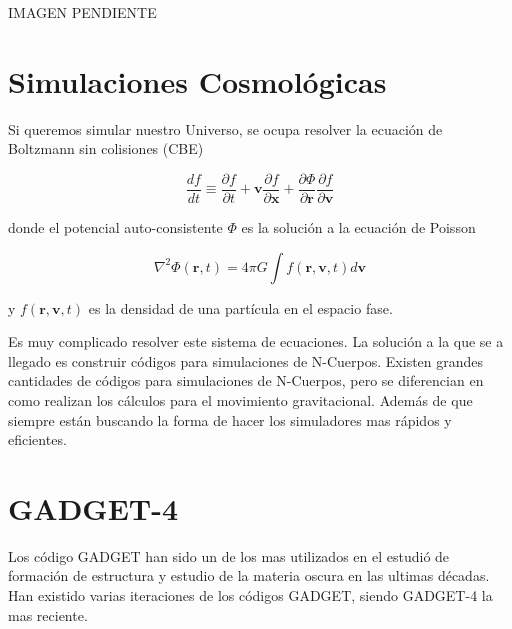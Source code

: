 {\LARGE
IMAGEN PENDIENTE
}
\section{Simulaciones Cosmológicas}
Si queremos simular nuestro Universo, se ocupa resolver la ecuación de Boltzmann sin colisiones (CBE)

\begin{equation}
\frac{d f}{d t} \equiv \frac{\partial f}{\partial t} + \mathbf{v}\frac{\partial f}{\partial \mathbf{x}} + \frac{\partial \Phi}{\partial \mathbf{r}} \frac{\partial f}{\partial \mathbf{v}}
\label{CBE}
\end{equation}

\noindent donde el potencial auto-consistente $\Phi$ es la solución a la ecuación de Poisson

\begin{equation}
\nabla^2\Phi(\mathbf{r},t) = 4\pi G \int f(\mathbf{r},\mathbf{v},t)d\mathbf{v}
\label{PoissonSol}
\end{equation}

\noindent y $f(\mathbf{r},\mathbf{v},t)$ es la densidad de una partícula en el espacio fase.

Es muy complicado resolver este sistema de ecuaciones. La solución a la que se a llegado es construir códigos para simulaciones de N-Cuerpos. Existen grandes cantidades de códigos para simulaciones de N-Cuerpos, pero se diferencian en como realizan los cálculos para el movimiento gravitacional. Además de que siempre están buscando la forma de hacer los simuladores mas rápidos y eficientes.


\section{GADGET-4}
Los código GADGET han sido un de los mas utilizados en el estudió de formación de estructura y estudio de la materia oscura en las ultimas décadas. Han existido varias iteraciones de los códigos GADGET, siendo GADGET-4 la mas reciente.

